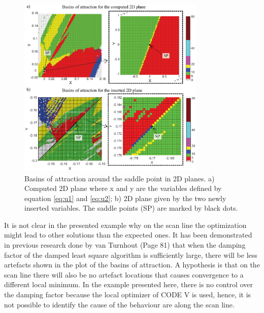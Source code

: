 \begin{figure}[h!]
    \centering
    \includegraphics[width=0.8\textwidth]{chapter-4/figures/Basins_two_situations.png}
    \caption{Basins of attraction around the saddle point in 2D planes. a) Computed 2D plane where x and y are the variables defined by equation \ref{eq:u1} and \ref{eq:u2}; b) 2D plane given by the two newly inserted variables. The saddle points (SP) are marked by black dots.}
    \label{fig:basins}
\end{figure}

It is not clear in the presented example why on the scan line the optimization might lead to other solutions than the expected ones. It has been demonstrated in previous research done by van Turnhout \cite{vanTurnhoutThesis2009} (Page 81)\cite{vanTurnhout2009_landscape_instab} that when the damping factor of the damped least square algorithm is sufficiently large, there will be less artefacts shown in the plot of the basins of attraction. A hypothesis is that on the scan line there will also be no artefact locations that causes convergence to a different local minimum. In the example presented here, there is no control over the damping factor because the local optimizer of CODE V is used, hence, it is not possible to identify the cause of the behaviour are along the scan line. 

